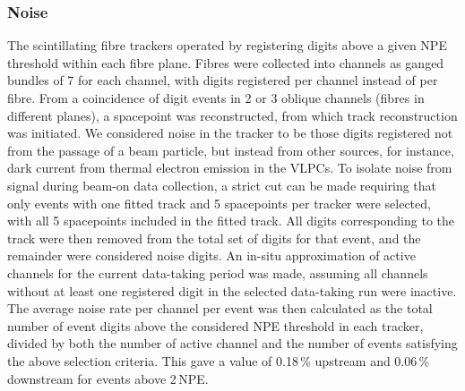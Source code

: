 \subsubsection{Noise}
The scintillating fibre trackers operated by registering digits above a given NPE threshold within each fibre plane. Fibres were collected into channels as ganged bundles of 7 for each channel, with digits registered per channel instead of per fibre. From a coincidence of digit events in 2 or 3 oblique channels (fibres in different planes), a spacepoint was reconstructed, from which track reconstruction was initiated. We considered noise in the tracker to be those digits registered not from the passage of a beam particle, but instead from other sources, for instance, dark current from thermal electron emission in the VLPCs. To isolate noise from signal during beam-on data collection, a strict cut can be made requiring that only events with one fitted track and 5 spacepoints per tracker were selected, with all 5 spacepoints included in the fitted track. All digits corresponding to the track were then removed from the total set of digits for that event, and the remainder were considered noise digits. An in-situ approximation of active channels for the current data-taking period was made, assuming all channels without at least one registered digit in the selected data-taking run were inactive. The average noise rate per channel per event was then calculated as the total number of event digits above the considered NPE threshold in each tracker, divided by both the number of active channel and the number of events satisfying the above selection criteria. This gave a value of 0.18\,\% upstream and 0.06\,\% downstream for events above 2\,NPE. 

